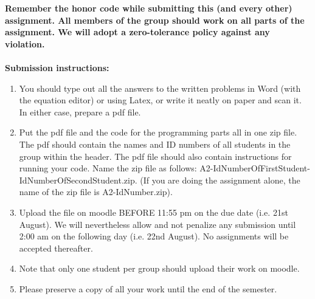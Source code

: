 \documentclass[11pt]{article}
\begin{document}
\maketitle

\textbf{Remember the honor code while submitting this (and every other) assignment. All members of the group should work on all parts of the assignment. We will adopt a \textbf{zero-tolerance policy} against any violation.}
\\
\\
\textbf{Submission instructions:} 
\begin{enumerate}
\item You should type out all the answers to the written problems in Word (with the equation editor) or using Latex, or write it neatly on paper and scan it. In either case, prepare a pdf file. 
\item Put the pdf file and the code for the programming parts all in one zip file. The pdf should contain the names and ID numbers of all students in the group within the header. The pdf file should also contain instructions for running your code. Name the zip file as follows: A2-IdNumberOfFirstStudent-IdNumberOfSecondStudent.zip. (If you are doing the assignment alone, the name of the zip file is A2-IdNumber.zip). 
\item Upload the file on moodle BEFORE 11:55 pm on the due date (i.e. 21st August). We will nevertheless allow and not penalize any submission until 2:00 am on the following day (i.e. 22nd August). No assignments will be accepted thereafter. 
\item Note that only one student per group should upload their work on moodle. 
\item Please preserve a copy of all your work until the end of the semester. 
\end{enumerate}
\end{document}
